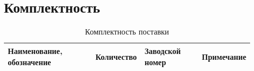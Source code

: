 \newpage

\section{Комплектность}

{
  \begin{table}[h]
    \caption{Комплектность поставки \genitivecasename}
    \centering
    \begin{tabularx}{\textwidth}{|m{7.2cm}|c|l|X|}
      \hline
      Наименование, обозначение&Количество&Заводской номер&Примечание\\\hline
      
    \end{tabularx}
    \label{tab:completeness}
  \end{table}
}
